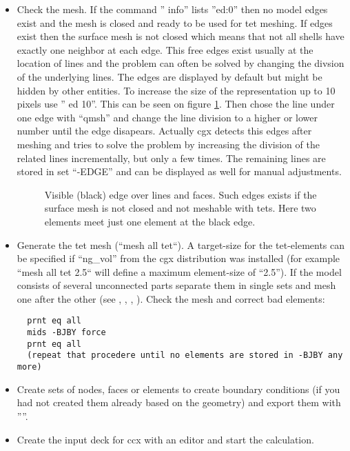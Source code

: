 \documentclass{article}
\begin{document}
\begin{appendix}
\begin{itemize}
\item Check the mesh. If the command '' info'' lists ''ed:0'' then no model edges exist and the mesh is closed and ready to be used for tet meshing. If edges exist then the surface mesh is not closed which means that not all shells have exactly one neighbor at each edge. This free edges exist usually at the location of lines and the problem can often be solved by changing the divsion of the underlying lines. The edges are displayed by default but might be hidden by other entities. To increase the size of the representation up to 10 pixels use '' ed 10''. This can be seen on figure \ref{surfmesh}. Then chose the line under one edge with ``qmsh'' and change the line division to a higher or lower number until the edge disapears. Actually cgx detects this edges after meshing and tries to solve the problem by increasing the division of the related lines incrementally, but only a few times. The remaining lines are stored in set ``-EDGE'' and can be displayed as well for manual adjustments. 
  
\begin{figure}[h]
\caption{\label{surfmesh}Visible (black) edge over lines and faces. Such edges exists if the surface mesh is not closed and not meshable with tets. Here two elements meet just one element at the black edge. }
\end{figure}

\item Generate the tet mesh (``mesh all tet``). A target-size for the tet-elements can be specified if ``ng\_vol'' from the cgx distribution was installed (for example ``mesh all tet 2.5`` will define a maximum element-size of ``2.5''). If the model consists of several unconnected parts separate them in single sets and mesh one after the other (see , , , ). Check the mesh and correct bad elements:
\begin{verbatim}
  prnt eq all
  mids -BJBY force
  prnt eq all
  (repeat that procedere until no elements are stored in -BJBY any more)
\end{verbatim}

\item Create sets of nodes, faces or elements to create boundary conditions (if you had not created them already based on the geometry) and export them with ''''.

\item Create the input deck for ccx with an editor and start the calculation.


\end{itemize}
\end{appendix}
\end{document}
